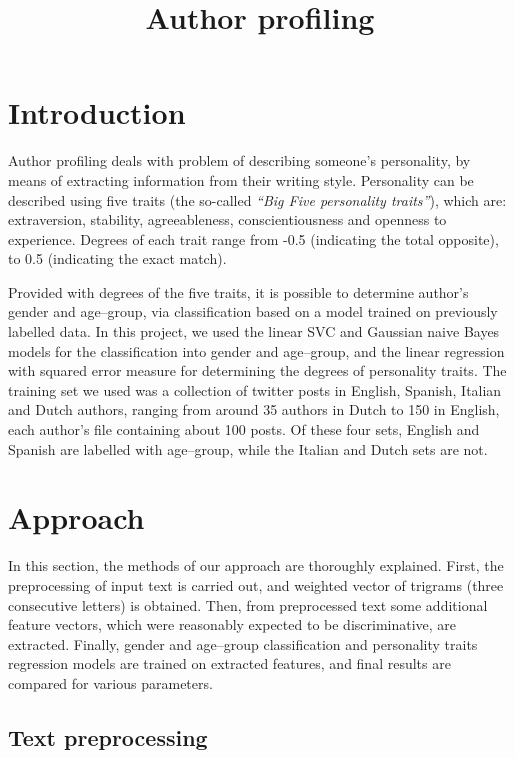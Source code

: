 \documentclass[10pt, a4paper]{article}
\title{Author profiling}
\begin{document}
\maketitleabstract

\section{Introduction}

Author profiling deals with problem of describing someone's personality, by means of extracting information from their writing style.
Personality can be described using five traits (the so-called \textit{``Big Five personality traits''}), which are: extraversion, stability, agreeableness, conscientiousness and openness to experience.
Degrees of each trait range from -0.5 (indicating the total opposite), to 0.5 (indicating the exact match).

Provided with degrees of the five traits, it is possible to determine author's gender and age--group, via classification based on a model trained on previously labelled data.
In this project, we used the linear SVC and Gaussian naive Bayes models for the classification into gender and age--group, and the linear regression with squared error measure for determining the degrees of personality traits.
The training set we used was a collection of twitter posts in English, Spanish, Italian and Dutch authors, ranging from around 35 authors in Dutch to 150 in English, each author's file containing about 100 posts.
Of these four sets, English and Spanish are labelled with age--group, while the Italian and Dutch sets are not.

\section{Approach}

In this section, the methods of our approach are thoroughly explained.
First, the preprocessing of input text is carried out, and weighted vector of trigrams (three consecutive letters) is obtained.
Then, from preprocessed text some additional feature vectors, which were reasonably expected to be discriminative, are extracted.
Finally, gender and age--group classification and personality traits regression models are trained on extracted features, and final results are compared for various parameters.

\subsection{Text preprocessing}
\end{document}
